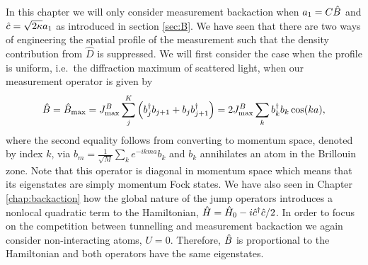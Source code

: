 In this chapter we will only consider measurement backaction when
$a_1 = C \hat{B}$ and $\hat{c} = \sqrt{2 \kappa} a_1$ as introduced in
section \ref{sec:B}. We have seen that there are two ways of
engineering the spatial profile of the measurement such that the
density contribution from $\hat{D}$ is suppressed. We will first
consider the case when the profile is uniform, i.e.~the diffraction
maximum of scattered light, when our measurement operator is given by
\begin{equation}
  \hat{B} = \hat{B}_\mathrm{max} = J^B_\mathrm{max} \sum_j^K \left( b^\dagger_j b_{j+1} + b_j
    b^\dagger_{j+1} \right)
  = 2 J^B_\mathrm{max} \sum_k b^\dagger_k b_k \cos(ka),
\end{equation}
where the second equality follows from converting to momentum space,
denoted by index $k$, via $b_m = \frac{1}{\sqrt{M}} \sum_k e^{-ikma}
b_k$ and $b_k$ annihilates an atom in the Brillouin zone. Note that
this operator is diagonal in momentum space which means that its
eigenstates are simply momentum Fock states. We have also seen in
Chapter \ref{chap:backaction} how the global nature of the jump
operators introduces a nonlocal quadratic term to the Hamiltonian,
$\hat{H} = \hat{H}_0 - i \hat{c}^\dagger \hat{c} / 2$. In order to focus on the
competition between tunnelling and measurement backaction we again
consider non-interacting atoms, $U = 0$. Therefore, $\hat{B}$ is
proportional to the Hamiltonian and both operators have the same
eigenstates.

